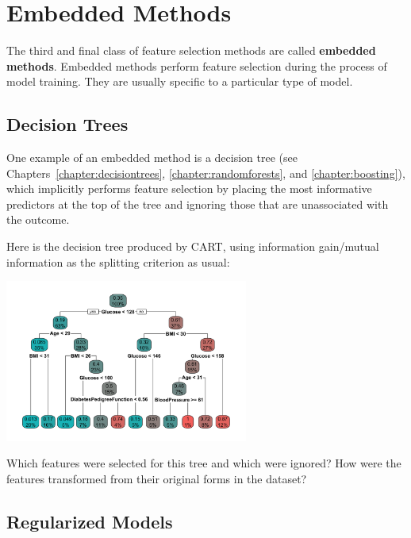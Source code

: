 
\section{Embedded Methods}

The third and final class of feature selection methods are called \textbf{embedded methods}. Embedded methods perform feature selection during the process of model training. They are usually specific to a particular type of model. 

\subsection{Decision Trees}

One example of an embedded method is a decision tree (see Chapters~\ref{chapter:decisiontrees}, \ref{chapter:randomforests}, and \ref{chapter:boosting}), which implicitly performs feature selection by placing the most informative predictors at the top of the tree and ignoring those that are unassociated with the outcome. 

\vspace{2mm}

\begin{question}{}
Here is the decision tree produced by CART, using information gain/mutual information as the splitting criterion as usual:
\begin{center}
\includegraphics[width=0.6\textwidth]{img/pima-decision-tree.png}
\end{center}
Which features were selected for this tree and which were ignored? How were the features transformed from their original forms in the dataset?
\end{question}

\subsection{Regularized Models}

